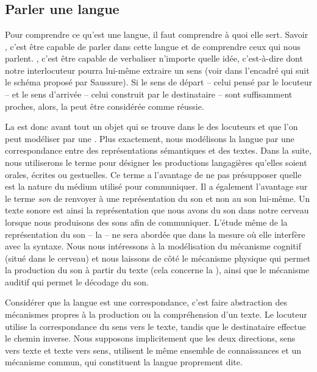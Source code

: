 \chapter{}\label{sec:1.1}

\section{Parler une langue}\label{sec:1.1.0}\largerpage

Pour comprendre ce qu’est une langue, il faut comprendre à quoi elle sert. Savoir , c’est être capable de parler dans cette langue et de comprendre ceux qui nous parlent. , c’est être capable de verbaliser n’importe quelle idée, c’est-à-dire  dont notre interlocuteur pourra lui-même extraire un sens (voir dans l’encadré qui suit le schéma proposé par Saussure). Si le sens de départ – celui pensé par le locuteur – et le sens d’arrivée – celui construit par le destinataire – sont suffisamment proches, alors, la  peut être considérée comme réussie.

La  est donc avant tout un objet qui se trouve dans le  des locuteurs et que l’on peut modéliser par une . Plus exactement, nous modélisons la langue par une correspondance entre des représentations sémantiques et des textes. Dans la suite, nous utiliserons le terme  pour désigner les productions langagières qu’elles soient orales, écrites ou gestuelles. Ce terme a l’avantage de ne pas présupposer quelle est la nature du médium utilisé pour communiquer. Il a également l’avantage sur le terme \textit{son} de renvoyer à une représentation du son et non au son lui-même. Un texte sonore est ainsi la représentation que nous avons du son dans notre cerveau lorsque nous produisons des sons afin de communiquer. L’étude même de la représentation du son – la  – ne sera abordée que dans la mesure où elle interfère avec la syntaxe. Nous nous intéressons à la modélisation du mécanisme cognitif (situé dans le cerveau) et nous laissons de côté le mécanisme physique qui permet la production du son à partir du texte (cela concerne la ), ainsi que le mécanisme auditif qui permet le décodage du son.

Considérer que la langue est une correspondance, c’est faire abstraction des mécanismes propres à la production ou la compréhension d’un texte. Le locuteur utilise la correspondance du sens vers le texte, tandis que le destinataire effectue le chemin inverse. Nous supposons implicitement que les deux directions, sens vers texte et texte vers sens, utilisent le même ensemble de connaissances et un mécanisme commun, qui constituent la langue proprement dite.

